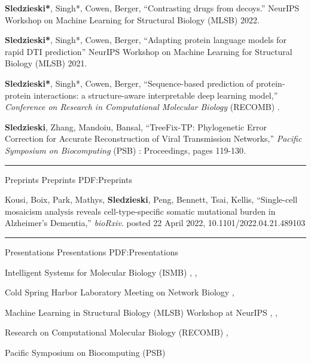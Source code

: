 \documentclass[letterpaper,MMMyyyy,nonstopmode]{simpleresumecv}
\begin{document}
\begin{Body}
\Gap
\NumberedItem{[4]}
{\textbf{Sledzieski*}, Singh*, Cowen, Berger,
``Contrasting drugs from decoys.'' NeurIPS Workshop on Machine Learning for Structural Biology (MLSB) 2022.}

\Gap
\NumberedItem{[3]}
{\textbf{Sledzieski*}, Singh*, Cowen, Berger,
``Adapting protein language models for rapid DTI prediction'' NeurIPS Workshop on Machine Learning for Structural Biology (MLSB) 2021.}

\Gap
\NumberedItem{[2]}
{\textbf{Sledzieski*}, Singh*, Cowen, Berger,
``Sequence-based prediction of protein-protein interactions: a structure-aware interpretable deep learning model,''
\textit{Conference on Research in Computational Molecular Biology} (RECOMB) .}

\NumberedItem{[1]}
{\textbf{Sledzieski}, Zhang, Mandoiu, Bansal,
``TreeFix-TP: Phylogenetic Error Correction for Accurate Reconstruction of Viral Transmission Networks,''
\textit{Pacific Symposium on Biocomputing} (PSB) : Proceedings, pages 119-130.}

\BigGap
\hrule
\Section
{Preprints}
{Preprints}
{PDF:Preprints}

\Gap
\NumberedItem{[1]}
{Kousi, Boix, Park, Mathys, \textbf{Sledzieski}, Peng, Bennett, Tsai, Kellis, ``Single-cell mosaicism analysis reveals cell-type-specific somatic mutational burden in Alzheimer's Dementia,'' \textit{bioRxiv}. posted 22 April 2022, 10.1101/2022.04.21.489103}

\BigGap
\hrule
\Section
{Presentations}
{Presentations}
{PDF:Presentations}


\Entry
{Intelligent Systems for Molecular Biology (ISMB)}
\hfill
{}, , 
\Gap

\Entry
{Cold Spring Harbor Laboratory Meeting on Network Biology}
\hfill
{}, 
\Gap

\Entry
{Machine Learning in Structural Biology (MLSB) Workshop at NeurIPS}
\hfill
{}, , 
\Gap

\Entry
{Research on Computational Molecular Biology (RECOMB)}
\hfill
{}, 
\Gap

\Entry
{Pacific Symposium on Biocomputing (PSB)}
\hfill
{}
\Gap


\end{Body}
\end{document}
